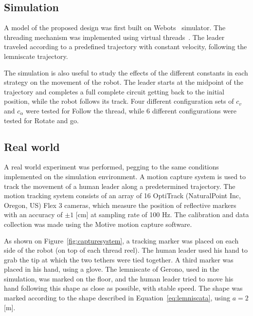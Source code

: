 \documentclass[journal]{IEEEtran}
\begin{document}
\subsection{Simulation}

A model of the proposed design was first built on Webots~\cite{Michel2004} simulator.  The threading mechanism was implemented using virtual threads~\cite{Rekleitis2001}.  The leader traveled according to a predefined trajectory with constant velocity, following the lemniscate trajectory.

The simulation is also useful to study the effects of the different constants in each strategy on the movement of the robot.  The leader starts at the midpoint of the trajectory and completes a full complete circuit getting back to the initial position, while the robot follows its track.  Four different configuration sets of $c_v$ and  $c_{\alpha}$ were tested for Follow the thread, while 6 different configurations were tested for Rotate and go.

\subsection{Real world}



A real world experiment was performed, pegging to the same conditions implemented on the simulation environment.  A motion capture system is used to track the movement of a human leader along a predetermined trajectory.   The motion tracking system consists of an array of 16 OptiTrack (NaturalPoint Inc, Oregon, US) Flex 3 cameras, which measure the position of reflective markers with an accuracy of $\pm1$ [cm] at sampling rate of 100 Hz. The calibration and data collection was made using the Motive motion capture software. 

As shown on Figure~\ref{fig:capturesystem}, a tracking marker was placed on each side of the robot (on top of each thread reel). The human leader used his hand to grab the tip at which the two tethers were tied together. A third marker was placed in his hand, using a glove. The lemniscate of Gerono, used in the simulation, was marked on the floor, and the human leader tried to move his hand following this shape as close as possible, with stable speed.  The shape was marked according to the shape described in Equation~\ref{eq:lemniscata}, using $a = 2$ [m].
\end{document}
